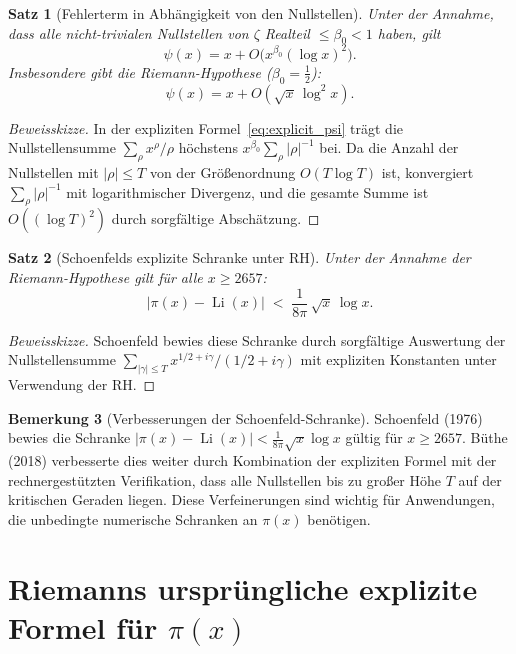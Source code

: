 \documentclass[12pt,a4paper]{amsart}
\newtheorem{theorem}{Satz}[section]
\theoremstyle{definition}
\newtheorem{remark}[theorem]{Bemerkung}
\DeclareMathOperator{\Li}{Li}
\begin{document}
\begin{theorem}[Fehlerterm in Abh\"angigkeit von den Nullstellen]
\label{thm:error_term}
Unter der Annahme, dass alle nicht-trivialen Nullstellen von $\zeta$
Realteil $\le \beta_0 < 1$ haben, gilt
\[
  \psi(x) = x + O\!\bigl(x^{\beta_0}(\log x)^2\bigr).
\]
Insbesondere gibt die Riemann-Hypothese ($\beta_0 = \tfrac{1}{2}$):
\[
  \psi(x) = x + O(\sqrt{x}\,\log^2 x).
\]
\end{theorem}

\begin{proof}[Beweisskizze]
In der expliziten Formel~\eqref{eq:explicit_psi} tr\"agt die Nullstellensumme
$\sum_\rho x^\rho/\rho$ h\"ochstens $x^{\beta_0}\sum_\rho |\rho|^{-1}$ bei.
Da die Anzahl der Nullstellen mit $|\rho| \le T$ von der Gr\"o\ss enordnung
$O(T\log T)$ ist, konvergiert $\sum_\rho |\rho|^{-1}$ mit logarithmischer
Divergenz, und die gesamte Summe ist $O((\log T)^2)$ durch sorgf\"altige
Absch\"atzung.
\end{proof}

\begin{theorem}[Schoenfelds explizite Schranke unter RH]
\label{thm:schoenfeld}
Unter der Annahme der Riemann-Hypothese gilt f\"ur alle $x \ge 2657$:
\[
  |\pi(x) - \Li(x)| \;<\; \frac{1}{8\pi}\,\sqrt{x}\,\log x.
\]
\end{theorem}

\begin{proof}[Beweisskizze]
Schoenfeld \cite{Schoenfeld1976} bewies diese Schranke durch sorgf\"altige
Auswertung der Nullstellensumme $\sum_{|\gamma| \le T} x^{1/2+i\gamma}/(1/2+i\gamma)$
mit expliziten Konstanten unter Verwendung der RH.
\end{proof}

\begin{remark}[Verbesserungen der Schoenfeld-Schranke]
Schoenfeld (1976) bewies die Schranke $|\pi(x) - \Li(x)| < \tfrac{1}{8\pi}\sqrt{x}\log x$
g\"ultig f\"ur $x \ge 2657$.  B\"uthe (2018) verbesserte dies weiter durch
Kombination der expliziten Formel mit der rechnergest\"utzten Verifikation,
dass alle Nullstellen bis zu gro\ss er H\"ohe $T$ auf der kritischen Geraden liegen.
Diese Verfeinerungen sind wichtig f\"ur Anwendungen, die unbedingte numerische
Schranken an $\pi(x)$ ben\"otigen.
\end{remark}

\section{Riemanns urspr\"ungliche explizite Formel f\"ur \texorpdfstring{$\pi(x)$}{pi(x)}}
\end{document}
